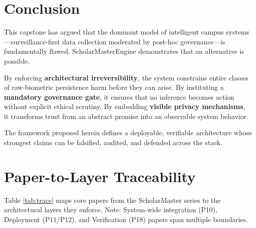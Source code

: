 \documentclass[conference]{IEEEtran}
\begin{document}
\section{Conclusion}
This capstone has argued that the dominant model of intelligent campus systems---surveillance-first data collection moderated by post-hoc governance---is fundamentally flawed. ScholarMasterEngine demonstrates that an alternative is possible.

By enforcing \textbf{architectural irreversibility}, the system constrains entire classes of raw-biometric persistence harm before they can arise. By instituting a \textbf{mandatory governance gate}, it ensures that no inference becomes action without explicit ethical scrutiny. By embedding \textbf{visible privacy mechanisms}, it transforms trust from an abstract promise into an observable system behavior.

The framework proposed herein defines a deployable, verifiable architecture whose strongest claims can be falsified, audited, and defended across the stack.

\appendices

\section{Paper-to-Layer Traceability}
Table \ref{tab:trace} maps core papers from the ScholarMaster series to the architectural layers they enforce. Note: System-wide integration (P10), Deployment (P11/P12), and Verification (P18) papers span multiple boundaries.
\end{document}
